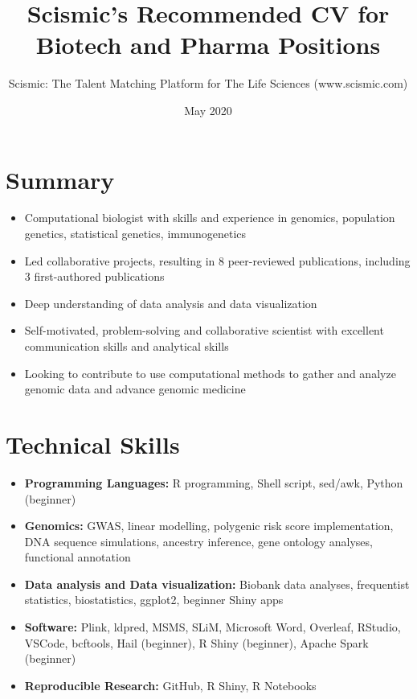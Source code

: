 \documentclass{article}
\title{Scismic's Recommended CV for Biotech and Pharma Positions}
\author{Scismic: The Talent Matching Platform for The Life Sciences (www.scismic.com)}
\date{May 2020}
\begin{document}
\makecvtitle %
\section{Summary}
\begin{itemize}
\item Computational biologist with skills and experience in genomics, population genetics, statistical genetics, immunogenetics
\item Led collaborative projects, resulting in 8 peer-reviewed publications, including 3 first-authored publications
\item Deep understanding of data analysis and data visualization 
\item Self-motivated, problem-solving and collaborative scientist with excellent communication skills and analytical skills
\item Looking to contribute to use computational methods to gather and analyze genomic data and advance genomic medicine
\end{itemize}
 
\section{Technical Skills}

\begin{itemize}
\item \textbf{Programming Languages:} R programming, Shell script, sed/awk, Python (beginner)
\item \textbf{Genomics:} GWAS, linear modelling, polygenic risk score implementation, DNA sequence simulations, ancestry inference, gene ontology analyses, functional annotation
\item \textbf{Data analysis and Data visualization:} Biobank data analyses, frequentist statistics, biostatistics, ggplot2, beginner Shiny apps
\item \textbf{Software:} Plink, ldpred, MSMS, SLiM, Microsoft Word, Overleaf, RStudio, VSCode, bcftools, Hail (beginner), R Shiny (beginner), Apache Spark (beginner)
\item \textbf{Reproducible Research:} GitHub, R Shiny, R Notebooks
\end{itemize}
 
\end{document}
